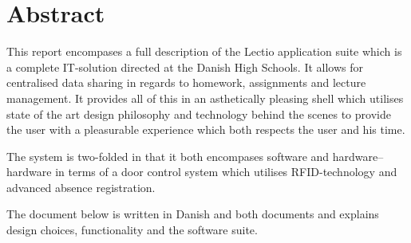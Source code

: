 \section{Abstract}
    This report encompases a full description of the Lectio application suite which is a complete IT-solution directed at the Danish High Schools. It allows for centralised data sharing in regards to homework, assignments and lecture management.
    It provides all of this in an asthetically pleasing shell which utilises state of the art design philosophy and technology behind the scenes to provide the user with a pleasurable experience which both respects the user and his time.

    The system is two-folded in that it both encompases software and hardware--hardware in terms of a door control system which utilises RFID-technology and advanced absence registration. 

    The document below is written in Danish and both documents and explains design choices, functionality and the software suite.
